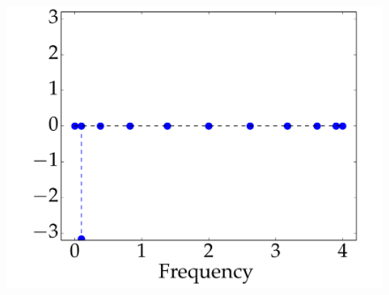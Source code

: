\begin{figure}
\begin{minipage}[c]{0.24\linewidth}
{			\includegraphics[width=\linewidth]{Figures/ring_different_structure_01_spectrum_EN.pdf}
		}
	\end{minipage}%
	\begin{minipage}[c]{0.24\linewidth}
		~
	\end{minipage}%
	\begin{minipage}[c]{0.25\linewidth}
		\subfloat[\label{fig:diff_struct_d}]{
}
\end{minipage}
\end{figure}
